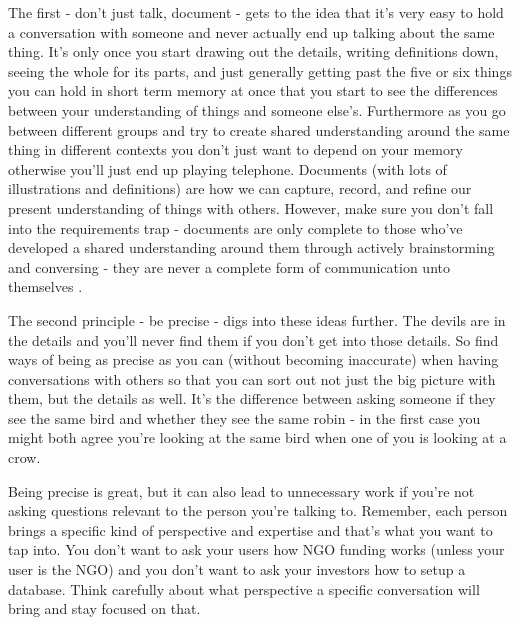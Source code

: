 \documentclass[11pt,a5paper]{book}
\begin{document}
The first - don't just talk, document - gets to the idea that it's very easy to hold a conversation with someone and never actually end up talking about the same thing. It's only once you start drawing out the details, writing definitions down, seeing the whole for its parts, and just generally getting past the five or six things you can hold in short term memory at once \cite{ericsson} that you start to see the differences between your understanding of things and someone else's. Furthermore as you go between different groups and try to create shared understanding around the same thing in different contexts you don't just want to depend on your memory otherwise you'll just end up playing telephone. Documents (with lots of illustrations and definitions) are how we can capture, record, and refine our present understanding of things with others. However, make sure you don't fall into the requirements trap - documents are only complete to those who've developed a shared understanding around them through actively brainstorming and conversing - they are never a complete form of communication unto themselves \cite{patton}.
\newline

The second principle - be precise - digs into these ideas further. The devils are in the details and you'll never find them if you don't get into those details. So find ways of being as precise as you can (without becoming inaccurate) when having conversations with others so that you can sort out not just the big picture with them, but the details as well. It's the difference between asking someone if they see the same bird and whether they see the same robin - in the first case you might both agree you're looking at the same bird when one of you is looking at a crow. 
\newline

Being precise is great, but it can also lead to unnecessary work if you're not asking questions relevant to the person you're talking to. Remember, each person brings a specific kind of perspective and expertise and that's what you want to tap into. You don't want to ask your users how NGO funding works (unless your user is the NGO) and you don't want to ask your investors how to setup a database. Think carefully about what perspective a specific conversation will bring and stay focused on that.
\newline
\end{document}
